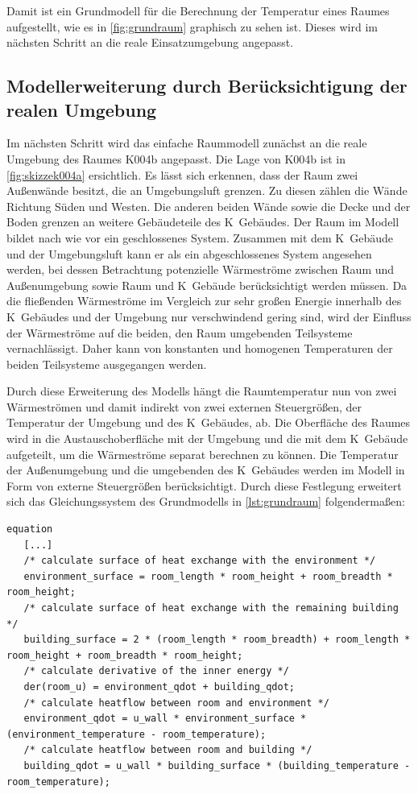 Damit ist ein Grundmodell für die Berechnung der Temperatur eines Raumes aufgestellt, wie es in \ref{fig:grundraum} graphisch zu sehen ist. Dieses wird im nächsten Schritt an die reale Einsatzumgebung angepasst.


\subsection{Modellerweiterung durch Berücksichtigung der realen Umgebung}

Im nächsten Schritt wird das einfache Raummodell zunächst an die reale Umgebung des Raumes K004b angepasst. Die Lage von K004b ist in \ref{fig:skizzek004a} ersichtlich. Es lässt sich erkennen, dass der Raum zwei Außenwände besitzt, die an Umgebungsluft grenzen. Zu diesen zählen die Wände Richtung Süden und Westen. Die anderen beiden Wände sowie die Decke und der Boden grenzen an weitere Gebäudeteile des K~Gebäudes. Der Raum im Modell bildet nach wie vor ein geschlossenes System. Zusammen mit dem K~Gebäude und der Umgebungsluft kann er als ein abgeschlossenes System angesehen werden, bei dessen Betrachtung potenzielle Wärmeströme zwischen Raum und Außenumgebung sowie Raum und K~Gebäude berücksichtigt werden müssen. Da die fließenden Wärmeströme im Vergleich zur sehr großen Energie innerhalb des K~Gebäudes und der Umgebung nur verschwindend gering sind, wird der Einfluss der Wärmeströme auf die beiden, den Raum umgebenden Teilsysteme vernachlässigt. Daher kann von konstanten und homogenen Temperaturen der beiden Teilsysteme ausgegangen werden.

Durch diese Erweiterung des Modells hängt die Raumtemperatur nun von zwei Wärmeströmen und damit indirekt von zwei externen Steuergrößen, der Temperatur der Umgebung und des K~Gebäudes, ab. Die Oberfläche des Raumes wird in die Austauschoberfläche mit der Umgebung und die mit dem K~Gebäude aufgeteilt, um die Wärmeströme separat berechnen zu können. Die Temperatur der Außenumgebung und die umgebenden des K~Gebäudes werden im Modell in Form von externe Steuergrößen berücksichtigt. Durch diese Festlegung erweitert sich das Gleichungssystem des Grundmodells in \ref{lst:grundraum} folgendermaßen:
\begin{lstlisting}[language=Modelica, caption={Erweitertes Gleichungssystem Modell des Raumes unter Berücksichtigung der realen Umgebung in Modelica}, label=lst:raumeins]
equation
   [...]
   /* calculate surface of heat exchange with the environment */
   environment_surface = room_length * room_height + room_breadth * room_height;
   /* calculate surface of heat exchange with the remaining building */
   building_surface = 2 * (room_length * room_breadth) + room_length * room_height + room_breadth * room_height;
   /* calculate derivative of the inner energy */
   der(room_u) = environment_qdot + building_qdot;
   /* calculate heatflow between room and environment */
   environment_qdot = u_wall * environment_surface * (environment_temperature - room_temperature);
   /* calculate heatflow between room and building */
   building_qdot = u_wall * building_surface * (building_temperature - room_temperature);
\end{lstlisting}

